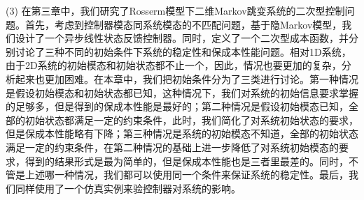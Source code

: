 	(3) 在第三章中，我们研究了Rosserm模型下二维Markov跳变系统的二次型控制问题。首先，考虑到控制器模态同系统模态的不匹配问题，基于隐Markov模型，我们设计了一个异步线性状态反馈控制器。同时，定义了一个二次型成本函数，并分别讨论了三种不同的初始条件下系统的稳定性和保成本性能问题。相对1D系统，由于2D系统的初始模态和初始状态都不止一个，因此，情况也要更加的复杂，分析起来也更加困难。在本章中，我们把初始条件分为了三类进行讨论。第一种情况是假设初始模态和初始状态都已知，这种情况下，我们对系统的初始信息要求掌握的足够多，但是得到的保成本性能是最好的；第二种情况是假设初始模态已知，全部的初始状态都满足一定的约束条件，此时，我们简化了对系统初始状态的要求，但是保成本性能略有下降；第三种情况是系统的初始模态不知道，全部的初始状态满足一定的约束条件，在第二种情况的基础上进一步降低了对系统初始模态的要求，得到的结果形式是最为简单的，但是保成本性能也是三者里最差的。同时，不管是上述哪一种情况，我们都可以使用同一个条件来保证系统的稳定性。最后，我们同样使用了一个仿真实例来验控制器对系统的影响。
	
	
	
	
	
	